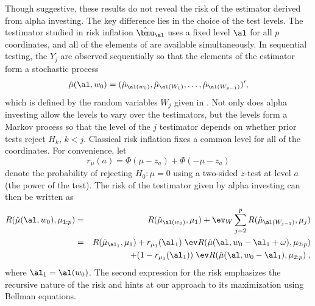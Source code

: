 \documentclass[12pt]{article}
\begin{document}
 Though suggestive, these results do not reveal the risk of the estimator
 derived from alpha investing.  The key difference lies in the choice of the
 test levels.  The testimator studied in risk inflation $\hat{\bmu}_\al$ uses a
 fixed level $\al$ for all $p$ coordinates, and all of the elements of \YY are
 available simultaneously.  In sequential testing, the $Y_j$ are observed
 sequentially so that the elements of the estimator form a stochastic process
 \begin{equation}
   \hat\mu(\al,w_0) = (\hat\mu_{\al(w_0)}, \hat\mu_{\al(W_1)}, \ldots, 
                       \hat\mu_{\al(W_{p-1})})',
 \label{eq:muHatAlphaInv}
 \end{equation}
 which is defined by the random variables $W_j$ given in .  Not only
 does alpha investing allow the levels to vary over the testimators, but the
 levels form a Markov process so that the level of the $j$ testimator depends on
 whether prior tests reject $H_k$, $k < j$.  Classical risk inflation fixes a
 common level for all of the coordinates.  For convenience, let
 \begin{equation}
   r_\mu(a) = \Phi(\mu-z_a)+\Phi(-\mu-z_a)   
 \label{eq:rMu}
 \end{equation}
 denote the probability of rejecting $H_0: \mu=0$ using a two-sided $z$-test at
 level $a$ (the power of the test).  The risk of the testimator given by alpha
 investing can then be written as
 \begin{eqnarray}
   R(\hat\mu(\al,w_0),\mu_{1:p}) 
    &=& R(\hat\mu_{\al(w_0)},\mu_1)
           + \ev_W \sum_{j=2}^p R(\hat\mu_{\al(W_{j-1})},\mu_j)  \cr
    &=& R(\hat\mu_{\al_1},\mu_1)
           + r_{\mu_1}(\al_1)\; \ev R(\hat\mu(\al,w_0-\al_1+\omega),\mu_{2:p})\cr
    & & \qquad + (1-r_{\mu_1}(\al_1))\; \ev R(\hat\mu(\al,w_0-\al_1),\mu_{2:p}) \;,
 \label{eq:riskTestAI}
 \end{eqnarray}
 where $\al_1 = \al(w_0)$.  The second expression for the risk emphasizes the
 recursive nature of the risk and hints at our approach to its maximization
 using Bellman equations.
\end{document}
